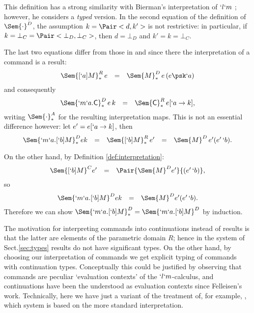 \documentclass{CSML}
\begin{document}
\noindent This definition has a strong similarity with Bierman's interpretation of $`l`m$ \cite{Bierman'98}; however, he considers a \emph{typed} version.
In the second equation of the definition of $ \Sem{ \cdot}^D$, the assumption $k = \Pair<d,k'>$ is not restrictive: in particular, if $k = \bot_C = \Pair<\bot_D , \bot_C>$, then $d = \bot_D$ and $k' = k = \bot_C$.

The last two equations differ from those in \cite{Bierman'98} and \cite{Streicher-Reus'98} since there the interpretation of a command is a result:
 \[ \begin{array}{rcl}
\Sem{ [`a]M}_*^R \, e &=& \Sem{ M }_*^D \, e \, (e \psk `a) 
 \end{array} \]
and consequently 
 \[ \begin{array}{rcl}
\Sem{ `m`a.\Cmd}_*^D \, e \, k &=& \Sem{ \Cmd}_*^R \, e[`a \to k],
 \end{array} \]
writing $\Sem{ \cdot}_*^A$ for the resulting interpretation maps. This is not an essential difference however:
let $e' = e[`a \to {k}]$, then
 \[ \begin{array}{rcccl}
\Sem{ `m`a.[`b]M}_*^{D }{e}{k} &=& \Sem{ [`b]M}_*^{R}\, e' &=& \Sem{ M}^{D } \, e' (e'\, `b).
 \end{array} \]

On the other hand, by Definition \ref{def:interpretation}:
 \[ \begin{array}{rcl}
\Sem{ [`b]M}^{C}{e}'&=& \Pair{\Sem{ M}^{D}{e'}}{(e' \, `b) }, 
 \end{array} \]
so
 \[ \begin{array}{rcl}
\Sem{ `m`a.[`b]M}^{D }{e}{k} &=& \Sem{ M}^{D }{e'}{(e'\, `b)}.
 \end{array} \]
Therefore we can show $\Sem{ `m`a.[`b]M}_*^{D } = \Sem{ `m`a.[`b]M}^{D }$ by induction.

The motivation for interpreting commands into continuations instead of results is that the latter are elements of the parametric domain $R$; hence
in the system of Sect.\skp\ref{sec:types} results do not have significant types. On the other hand, by choosing our interpretation of commands we get explicit typing of commands with continuation types. 
Conceptually this could be justified by observing that commands are peculiar `evaluation contexts' of the $`l`m$-calculus, and continuations have been the understood as evaluation contexts since Felleisen's work.
Technically, here we have just a variant of the treatment of, for example, \cite{deLiguoro:ApproxLM12}, which system is based on the more standard interpretation.
 
\end{document}
